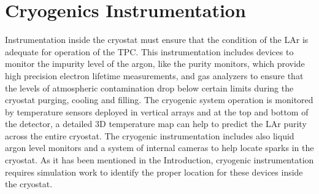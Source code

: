 \section{Cryogenics Instrumentation}
\label{sec:fdsp-cryo-instr} %
\label{sec:fddp-cryo-instr} %
\label{sec:fdgen-cryo-instr} %

Instrumentation inside the cryostat must ensure that the condition of the LAr is adequate for operation of the TPC. This instrumentation includes devices to monitor the impurity level of the argon, like the purity monitors, which provide high precision electron lifetime measurements,
and gas analyzers to ensure that the levels of atmospheric contamination drop below certain limits during the cryostat purging, cooling and filling.
The cryogenic system operation is monitored by temperature sensors deployed in vertical arrays and at the top and bottom of the detector, a detailed 3D temperature map can help to predict the LAr purity across the entire cryostat. The cryogenic instrumentation includes also liquid argon level monitors and
a system of internal cameras to help locate sparks in the cryostat.
As it has been mentioned in the Introduction, cryogenic instrumentation requires simulation work to identify the proper location for these devices inside the cryostat.



